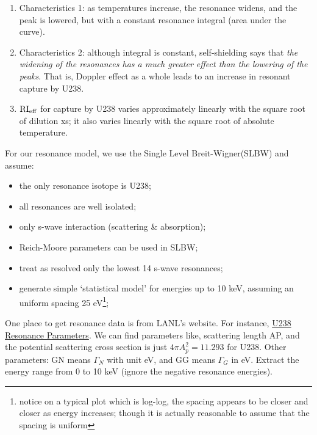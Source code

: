 \documentclass{school-22.211-notes}
\begin{document}
\begin{enumerate}
\begin{enumerate}
\item Characteristics 1: as temperatures increase, the resonance widens, and the peak is lowered, but with a constant resonance integral (area under the curve). 
\item Characteristics 2: although integral is constant, self-shielding says that \textit{the widening of the resonances has a much greater effect than the lowering of the peaks}. That is, Doppler effect as a whole leads to an increase in resonant capture by U238. 
\item $\mathrm{RI}_{\mathrm{eff}}$ for capture by U238 varies approximately linearly with the square root of dilution xs; it also varies linearly with the square root of absolute temperature. 
\end{enumerate}
\end{enumerate}


\clearpage
{}
For our resonance model, we use the Single Level Breit-Wigner(SLBW) and assume:
\begin{itemize}
  \item the only resonance isotope is U238;
  \item all resonances are well isolated;
  \item only s-wave interaction (scattering \& absorption);
  \item Reich-Moore parameters can be used in SLBW;
  \item treat as resolved only the lowest 14 s-wave resonances;
  \item generate simple `statistical model' for energies up to 10 keV, assuming an uniform spacing 25 eV\footnote{notice on a typical plot which is log-log, the spacing appears to be closer and closer as energy increases; though it is actually reasonable to assume that the spacing is uniform};
\end{itemize}

One place to get resonance data is from LANL's website. For instance, \href{http://t2.lanl.gov/cgi-bin/endf?2,151,/inet/WWW/data/data/ENDFB-VII-neutron/U/238}{U238 Resonance Parameters}. We can find parameters like, scattering length AP, and the potential scattering cross section is just $4 \pi A_p^2 = 11.293$ for U238. Other parameters: GN means $\Gamma_N$ with unit eV, and GG means $\Gamma_G$ in eV. Extract the energy range from 0 to 10 keV (ignore the negative resonance energies). 
\end{document}

